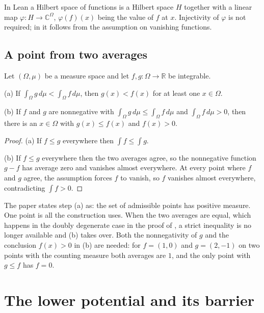 In Lean a Hilbert space of functions is a Hilbert space $H$ together with a linear map
$\varphi : H \to \mathbb{C}^{\Omega}$, $\varphi(f)(x)$ being the value of $f$ at $x$.
Injectivity of $\varphi$ is not required; in  it follows from
the assumption on vanishing functions.

\section{A point from two averages}

\begin{lemma}
\label{lem:point-from-averages}
\leanok
Let $(\Omega, \mu)$ be a measure space and let $f, g : \Omega \to \mathbb{R}$ be
integrable.

(a) If $\int_\Omega g \, d\mu < \int_\Omega f \, d\mu$, then $g(x) < f(x)$ for at least
one $x \in \Omega$.

(b) If $f$ and $g$ are nonnegative with $\int_\Omega g \, d\mu \leq \int_\Omega f \, d\mu$
and $\int_\Omega f \, d\mu > 0$, then there is an $x \in \Omega$ with $g(x) \leq f(x)$
and $f(x) > 0$.
\end{lemma}

\begin{proof}
\leanok
(a) If $f \leq g$ everywhere then $\int f \leq \int g$.

(b) If $f \leq g$ everywhere then the two averages agree, so the nonnegative function
$g - f$ has average zero and vanishes almost everywhere. At every point where $f$ and
$g$ agree, the assumption forces $f$ to vanish, so $f$ vanishes almost everywhere,
contradicting $\int f > 0$.
\end{proof}

The paper states step (a) as: the set of admissible points has positive measure. One
point is all the construction uses. When the two averages are equal, which happens in
the doubly degenerate case in the proof of , a strict
inequality is no longer available and (b) takes over. Both the nonnegativity of $g$ and the conclusion $f(x) > 0$ in (b)
are needed: for $f = (1, 0)$ and $g = (2, -1)$ on two points with the counting measure
both averages are $1$, and the only point with $g \leq f$ has $f = 0$.

\chapter{The lower potential and its barrier}
\label{ch:lower-barrier}

